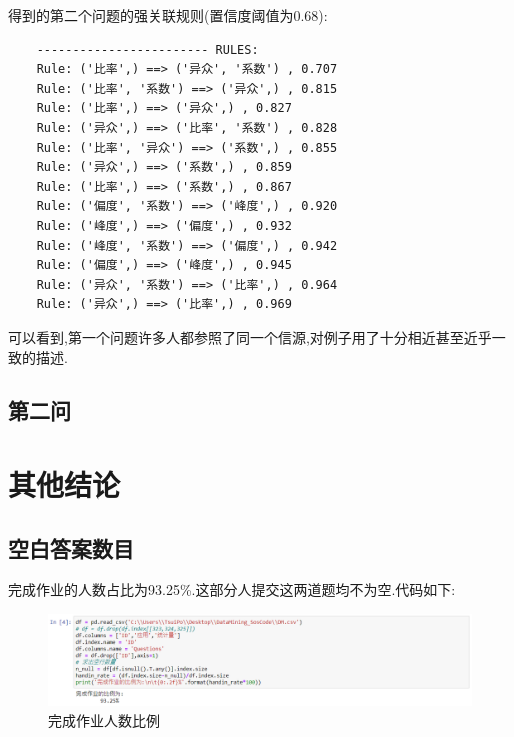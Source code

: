 \documentclass[lang=cn,11pt,a4paper,cite=authoryear]{elegantpaper}
\begin{document}
得到的第二个问题的强关联规则(置信度阈值为0.68):\par
\begin{lstlisting}
	------------------------ RULES:
	Rule: ('比率',) ==> ('异众', '系数') , 0.707
	Rule: ('比率', '系数') ==> ('异众',) , 0.815
	Rule: ('比率',) ==> ('异众',) , 0.827
	Rule: ('异众',) ==> ('比率', '系数') , 0.828
	Rule: ('比率', '异众') ==> ('系数',) , 0.855
	Rule: ('异众',) ==> ('系数',) , 0.859
	Rule: ('比率',) ==> ('系数',) , 0.867
	Rule: ('偏度', '系数') ==> ('峰度',) , 0.920
	Rule: ('峰度',) ==> ('偏度',) , 0.932
	Rule: ('峰度', '系数') ==> ('偏度',) , 0.942
	Rule: ('偏度',) ==> ('峰度',) , 0.945
	Rule: ('异众', '系数') ==> ('比率',) , 0.964
	Rule: ('异众',) ==> ('比率',) , 0.969
\end{lstlisting}
可以看到,第一个问题许多人都参照了同一个信源,对例子用了十分相近甚至近乎一致的描述.
\subsection{第二问}
\section{其他结论}
\subsection{空白答案数目}
完成作业的人数占比为93.25\%.这部分人提交这两道题均不为空.代码如下:\par
\begin{figure}[thbp!]
	\centering
	\includegraphics[width=1.1\linewidth]{image/handin}
	\caption{完成作业人数比例}
\end{figure}
\end{document}
